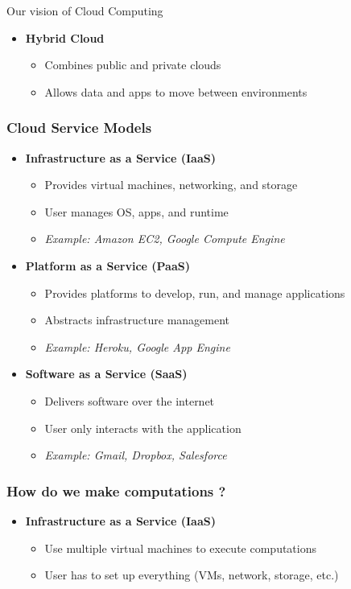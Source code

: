 \documentclass[10pt,aspectratio=1609]{beamer}
\begin{document}
\begin{section}{Our vision of Cloud Computing}
\begin{frame}
\begin{itemize}
    \item \textbf{Hybrid Cloud}
    \begin{itemize}
      \item Combines public and private clouds
      \item Allows data and apps to move between environments
    \end{itemize}
  \end{itemize}
\end{frame}

\begin{frame}
  \frametitle{Cloud Service Models}

  \begin{itemize}
    \item \textbf{Infrastructure as a Service (IaaS)}
    \begin{itemize}
      \item Provides virtual machines, networking, and storage
      \item User manages OS, apps, and runtime
      \item \emph{Example: Amazon EC2, Google Compute Engine}
    \end{itemize}

    \item \textbf{Platform as a Service (PaaS)}
    \begin{itemize}
      \item Provides platforms to develop, run, and manage applications
      \item Abstracts infrastructure management
      \item \emph{Example: Heroku, Google App Engine}
    \end{itemize}

    \item \textbf{Software as a Service (SaaS)}
    \begin{itemize}
      \item Delivers software over the internet
      \item User only interacts with the application
      \item \emph{Example: Gmail, Dropbox, Salesforce}
    \end{itemize}
  \end{itemize}
\end{frame}

\begin{frame}
  \frametitle{How do we make computations ?}

  \begin{itemize}
    \item \textbf{Infrastructure as a Service (IaaS)}
    \begin{itemize}
      \item Use multiple virtual machines to execute computations
      \item User has to set up everything (VMs, network, storage, etc.)
    \end{itemize}


\end{itemize}
\end{frame}
\end{section}
\end{document}
